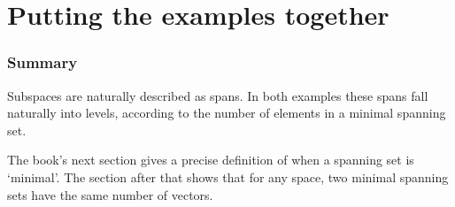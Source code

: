 \documentclass[10pt,t]{beamer}
\begin{document}
\section{Putting the examples together}
\begin{frame}
  \frametitle{Summary}

Subspaces are naturally described as spans.
In both examples these spans fall naturally into levels, 
according to the 
number of elements in a minimal spanning set. 

The book's next section gives a precise definition of 
when a spanning set is `minimal'.
The section after that shows that for any space, 
two minimal spanning sets have the same number of vectors.
\end{frame}

% 
\end{document}
